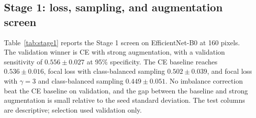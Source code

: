 \documentclass[11pt]{article}
\begin{document}
\subsection{Stage 1: loss, sampling, and augmentation screen}

Table~\ref{tab:stage1} reports the Stage 1 screen on EfficientNet-B0 at 160 pixels. The validation winner is CE with strong augmentation, with a validation sensitivity of $0.556\pm0.027$ at 95\% specificity. The CE baseline reaches $0.536\pm0.016$, focal loss with class-balanced sampling $0.502\pm0.039$, and focal loss with $\gamma=3$ and class-balanced sampling $0.449\pm0.051$. No imbalance correction beat the CE baseline on validation, and the gap between the baseline and strong augmentation is small relative to the seed standard deviation. The test columns are descriptive; selection used validation only.

\begin{table}[t]
\centering
\small
\caption{Stage 1 screen on EfficientNet-B0 at 160 pixels. Validation sensitivity is used for model selection. Validation values are mean and standard deviation across three seeds. Test sensitivity is the mean with a 95\% t interval across three seeds at the validation-selected 95\% specificity threshold.}
\label{tab:stage1}
\end{table}
\end{document}
